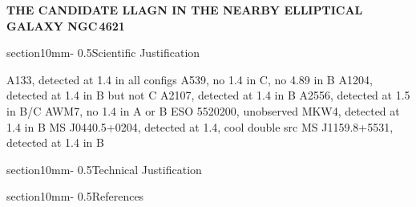 \documentclass[letterpaper,11pt,twocolumn]{article}
\makeatletter
\renewcommand{\section}{\@startsection%
{section}{1}{0mm}{-\baselineskip}%
{0.5\baselineskip}{\normalfont\Large\bfseries}}%
\makeatother
\begin{document}
\pagestyle{plain}

\begin{center} 
\bfseries\uppercase{%
The Candidate LLAGN in the Nearby Elliptical Galaxy NGC\,4621
}
\end{center}

\section{Scientific Justification}

A133, detected at 1.4 in all configs
A539, no 1.4 in C, no 4.89 in B
A1204, detected at 1.4 in B but not C
A2107, detected at 1.4 in B
A2556, detected at 1.5 in B/C
AWM7, no 1.4 in A or B
ESO 5520200, unobserved
MKW4, detected at 1.4 in B
MS J0440.5+0204, detected at 1.4, cool double src
MS J1159.8+5531, detected at 1.4 in B

\section{Technical Justification}


\section{References}
\end{document}
